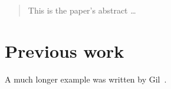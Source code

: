 \documentclass[12pt]{article}
\begin{document}
\maketitle
\newpage


\tableofcontents
\newpage
\listoffigures
\newpage
\listoftables
\newpage
\begin{abstract}
This is the paper's abstract \ldots
\end{abstract}

\pagestyle{empty} %
 


\newpage
\setcounter{page}{1}
\newpage
\newpage
\newpage
\newpage
\newpage
\newpage

\newpage
\section{Previous work}%
A much longer \LaTeXe{} example was written by Gil~\cite{Gil:02}.



\end{document}
